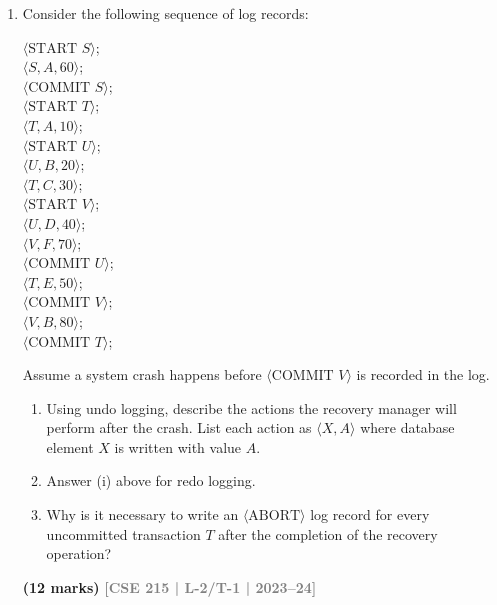 \documentclass[12pt]{article}
\newcommand{\yr}[1]{\hfill\textcolor{gray}{\small\textbf{[#1]}}}
\newcommand{\mk}[1]{\textcolor{orange!70!black}{\small\textbf{(#1 marks)}}}
\begin{document}
\begin{enumerate}
\item Consider the following sequence of log records:
\begin{center}
\small\ttfamily
$\langle\text{START } S\rangle$; \\
$\langle S, A, 60\rangle$; \\
$\langle\text{COMMIT } S\rangle$; \\
$\langle\text{START } T\rangle$; \\
$\langle T, A, 10\rangle$; \\
$\langle\text{START } U\rangle$; \\
$\langle U, B, 20\rangle$; \\
$\langle T, C, 30\rangle$; \\
$\langle\text{START } V\rangle$; \\
$\langle U, D, 40\rangle$; \\
$\langle V, F, 70\rangle$; \\
$\langle\text{COMMIT } U\rangle$; \\
$\langle T, E, 50\rangle$; \\
$\langle\text{COMMIT } V\rangle$; \\
$\langle V, B, 80\rangle$; \\
$\langle\text{COMMIT } T\rangle$;
\end{center}
Assume a system crash happens before $\langle\text{COMMIT } V\rangle$ is recorded in the log.
\begin{enumerate}
  \item Using undo logging, describe the actions the recovery manager will perform after the crash. List each action as $\langle X, A\rangle$ where database element $X$ is written with value $A$.
  \item Answer (i) above for redo logging.
  \item Why is it necessary to write an $\langle\text{ABORT}\rangle$ log record for every uncommitted transaction $T$ after the completion of the recovery operation?
\end{enumerate}
\mk{12} \yr{CSE 215 | L-2/T-1 | 2023--24}




\end{enumerate}
\end{document}
